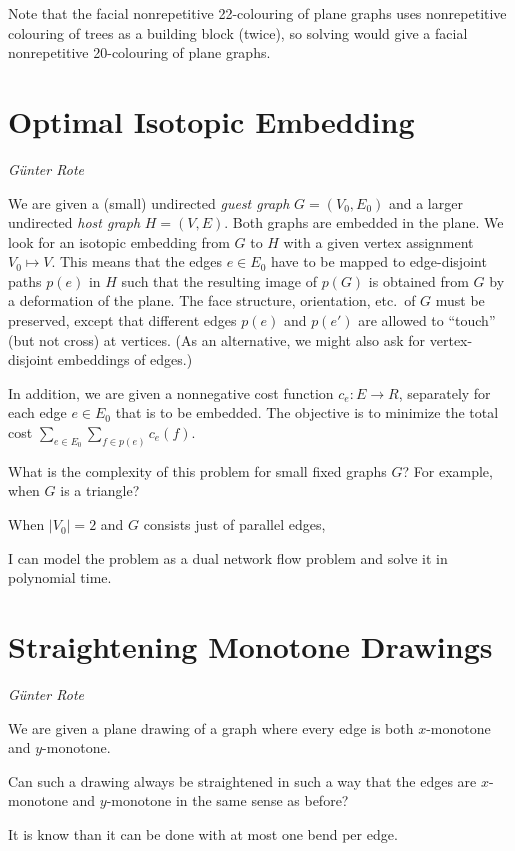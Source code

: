 \documentclass{patmorin}
\begin{document}
Note that the facial nonrepetitive 22-colouring of plane graphs
uses nonrepetitive colouring of trees as a building block (twice), so
solving  would give a facial nonrepetitive
20-colouring of plane graphs.

\section{Optimal Isotopic Embedding}

\noindent\emph{G\"unter Rote}

We are given a (small) undirected \emph{guest graph} $G=(V_0,E_0)$
and a larger undirected \emph{host graph} $H=(V,E)$.
Both graphs are embedded in the plane.
We look for an isotopic embedding from $G$ to $H$ with
a given vertex assignment $V_0\mapsto V$. This means that
the edges $e\in E_0$ have to be mapped to edge-disjoint
paths $p(e)$ in $H$ such that the resulting image of $p(G)$ is obtained
from $G$ by a deformation of the plane. The face structure, orientation,
etc.\ of $G$ must be preserved, except that different edges $p(e)$
and $p(e')$ are allowed to ``touch'' (but not cross) at vertices.
(As an alternative, we might also ask for vertex-disjoint embeddings of edges.)

In addition, we are given a nonnegative cost function
$c_e\colon E\to R$, separately for each edge $e\in E_0$ that is to be embedded.
The objective is to minimize the total cost
$\sum_{e\in E_0} \sum_{f \in p(e)} c_e(f)$.

What is the complexity of this problem for small fixed
graphs $G$? For example, when $G$ is a triangle?

When $|V_0|=2$ and $G$ consists just of parallel edges,

I can model the problem as a dual network flow problem and solve it
in polynomial time.

\section{Straightening Monotone Drawings}

\noindent\emph{G\"unter Rote}

We are given a plane drawing of a graph where every
edge is both $x$-monotone and $y$-monotone.
\begin{op}
Can such a drawing always be straightened in such a way
that the edges are $x$-monotone and $y$-monotone
in the same sense as before?
\end{op}
It is know than it can be done with at most one bend per edge.
\end{document}
